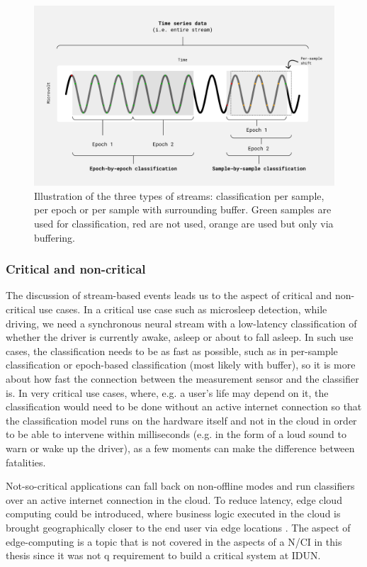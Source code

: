 \begin{figure}[!ht]
  \centering
  \includegraphics[width=\linewidth]{per-sample.png}
  \caption{Illustration of the three types of streams: classification per sample, per epoch or per sample with surrounding buffer. Green samples are used for classification, red are not used, orange are used but only via buffering.}
  \label{fig:per-sample}
\end{figure}

\subsubsection{Critical and non-critical}
\label{chapter5-critical-and-non-critical}

The discussion of stream-based events leads us to the aspect of critical and non-critical use cases. In a critical use case such as microsleep detection, while driving, we need a synchronous neural stream with a low-latency classification of whether the driver is currently awake, asleep or about to fall asleep. In such use cases, the classification needs to be as fast as possible, such as in per-sample classification or epoch-based classification (most likely with buffer), so it is more about how fast the connection between the measurement sensor and the classifier is. In very critical use cases, where, e.g. a user's life may depend on it, the classification would need to be done without an active internet connection so that the classification model runs on the hardware itself and not in the cloud in order to be able to intervene within milliseconds (e.g. in the form of a loud sound to warn or wake up the driver), as a few moments can make the difference between fatalities.

Not-so-critical applications can fall back on non-offline modes and run classifiers over an active internet connection in the cloud. To reduce latency, edge cloud computing could be introduced, where business logic executed in the cloud is brought geographically closer to the end user via edge locations \citep{nomios_what_nodate}. The aspect of edge-computing is a topic that is not covered in the aspects of a N/CI in this thesis since it was not q requirement to build a critical system at IDUN.

